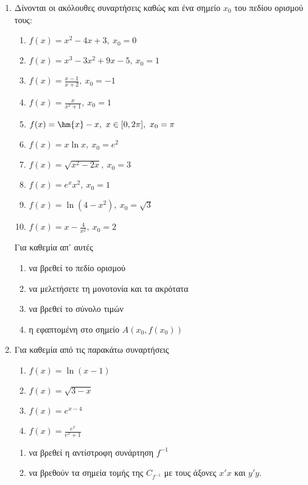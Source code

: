 \documentclass[10pt,a4paper]{article}
\begin{document}
\begin{enumerate}
\item Δίνονται οι ακόλουθες συναρτήσεις καθώς και ένα σημείο $ x_0 $ του πεδίου ορισμού τους:
\begin{multicols}{2}
\begin{enumerate}[itemsep=0mm,label=\roman*.]
\item $ f(x)=x^2-4x+3,\ x_0=0 $
\item $ f(x)=x^3-3x^2+9x-5,\ x_0=1 $
\item $ f(x)=\frac{x-1}{x+2},\ x_0=-1 $
\item $ f(x)=\frac{x}{x^2+1},\ x_0=1 $
\item $ f(x)=\hm{x}-x,\ x\in[0,2\pi],\ x_0=\pi$
\item $ f(x)=x\ln{x},\ x_0=e^2 $
\item $ f(x)=\sqrt{x^2-2x},\ x_0=3 $
\item $ f(x)=e^xx^2,\ x_0=1 $
\item $ f(x)=\ln{\left(4-x^2\right)},\ x_0=\sqrt{3} $
\item $ f(x)=x-\frac{4}{x^2},\ x_0=2 $
\end{enumerate}
\end{multicols}
Για καθεμία απ' αυτές
\begin{enumerate}[itemsep=0mm,label=\alph*.]
\item να βρεθεί το πεδίο ορισμού
\item να μελετήσετε τη μονοτονία και τα ακρότατα
\item να βρεθεί το σύνολο τιμών
\item η εφαπτομένη στο σημείο $ A(x_0,f(x_0)) $
\end{enumerate}
\item Για καθεμία από τις παρακάτω συναρτήσεις
\begin{multicols}{2}
\begin{enumerate}[itemsep=0mm,label=\roman*.]
\item $ f(x)=\ln{(x-1)} $
\item $ f(x)=\sqrt{3-x} $
\item $ f(x)=e^{x-4} $
\item $ f(x)=\frac{e^x}{e^x+1} $
\end{enumerate}
\end{multicols}
\begin{enumerate}[itemsep=0mm,label=\alph*.]
\item να βρεθεί η αντίστροφη συνάρτηση $ f^{-1} $
\item να βρεθούν τα σημεία τομής της $ C_{f^{-1}} $ με τους άξονες $ x'x $ και $ y'y $.

\end{enumerate}
\end{enumerate}
\end{document}
